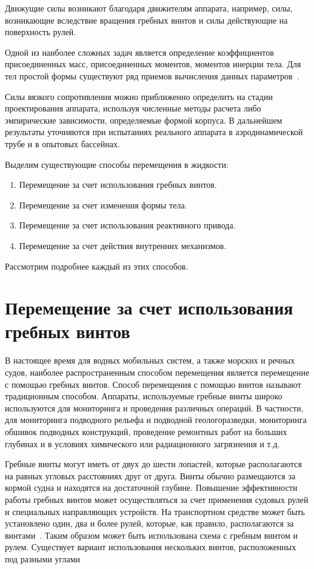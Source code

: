 Движущие силы возникают благодаря движителям аппарата, например, силы, возникающие вследствие вращения гребных винтов и силы действующие на поверхность рулей.

Одной из наиболее сложных задач является определение коэффициентов присоединенных масс, присоединенных моментов, моментов инерции тела. Для тел простой формы существуют ряд приемов вычисления данных параметров~\cite{Pantov_etc_1973}.

Силы вязкого сопротивления можно приближенно определить на стадии проектирования аппарата, используя численные методы расчета либо эмпирические зависимости, определяемые формой корпуса. В дальнейшем результаты уточняются при испытаниях реального аппарата в аэродинамической трубе и в опытовых бассейнах.

Выделим существующие способы перемещения в жидкости:

\begin{enumerate}
	\item Перемещение за счет использования гребных винтов.
	\item Перемещение за счет изменения формы тела.
	\item Перемещение за счет использования реактивного привода.
	\item Перемещение за счет действия внутренних механизмов.
\end{enumerate}

Рассмотрим подробнее каждый из этих способов.

\section{Перемещение за счет использования гребных винтов}\label{sec:ch1/sec2}

В настоящее время для водных мобильных систем, а также морских и речных судов, наиболее распространенным способом перемещения является перемещение с помощью гребных винтов. Способ перемещения с помощью винтов называют традиционным способом. Аппараты, используемые гребные винты широко используются для мониторинга и проведения различных операций. В частности, для мониторинга подводного рельефа и подводной геологоразведки, мониторинга обшивок подводных конструкций, проведение ремонтных работ на больших глубинах и в условиях химического или радиационного загрязнения и т.д. 

Гребные винты могут иметь от двух до шести лопастей, которые располагаются на равных угловых расстояниях друг от друга. Винты обычно размещаются за кормой судна и находятся на достаточной глубине. Повышение эффективности работы гребных винтов может осуществляться за счет применения судовых рулей и специальных направляющих устройств. На транспортном средстве может быть установлено один, два и более рулей, которые, как правило, располагаются за винтами~\cite{Basin_Anfimov_1961}. Таким образом может быть использована схема с гребным винтом и рулем. Существует вариант использования нескольких винтов, расположенных под разными углами~\cite{Lebedev_Pershits_1969, Gornak_MMT3000}

